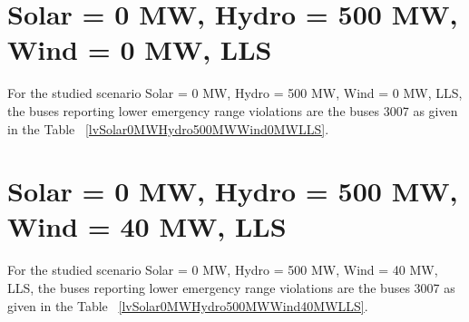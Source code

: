 \documentclass[10pt]{report}
\begin{document}
\section{Solar = 0 MW, Hydro = 500 MW, Wind = 0 MW, LLS}
For the studied scenario Solar = 0 MW, Hydro = 500 MW, Wind = 0 MW, LLS, the buses reporting lower emergency range violations are the buses 3007 as given in the Table ~\ref{lvSolar0MWHydro500MWWind0MWLLS}.
\begin{table}[H]
\caption{Contingencies reporting bus voltages lower than emergency voltage of 1.1 PU for scenario Solar = 0 MW, Hydro = 500 MW, Wind = 0 MW, LLS}
\label{lvSolar0MWHydro500MWWind0MWLLS}
\centering
{}
\end{table}

\section{Solar = 0 MW, Hydro = 500 MW, Wind = 40 MW, LLS}
For the studied scenario Solar = 0 MW, Hydro = 500 MW, Wind = 40 MW, LLS, the buses reporting lower emergency range violations are the buses 3007 as given in the Table ~\ref{lvSolar0MWHydro500MWWind40MWLLS}.
\begin{table}[H]
\caption{Contingencies reporting bus voltages lower than emergency voltage of 1.1 PU for scenario Solar = 0 MW, Hydro = 500 MW, Wind = 40 MW, LLS}
\label{lvSolar0MWHydro500MWWind40MWLLS}
\centering
{}
\end{table}
\end{document}
